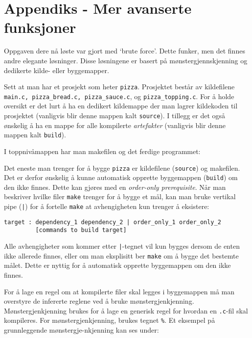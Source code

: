\appendix

\section{Appendiks - Mer avanserte funksjoner}\label{4-appendix}


Oppgaven dere nå løste var gjort med `brute force'. Dette funker, men det finnes andre elegante løsninger. Disse løsningene er basert på mønstergjennskjenning og dedikerte kilde- eller byggemapper.

Sett at man har et prosjekt som heter \verb|pizza|. Prosjektet består av kildefilene \verb|main.c, pizza_bread.c, pizza_sauce.c|, og \verb|pizza_topping.c|. For å holde oversikt er det lurt å ha en dedikert kildemappe der man lagrer kildekoden til prosjektet (vanligvis blir denne mappen kalt \verb|source|). I tillegg er det også ønskelig å ha en mappe for alle kompilerte \textit{artefakter} (vanligvis blir denne mappen kalt \verb|build|). 

I toppnivåmappen har man makefilen og det ferdige programmet:


Det eneste man trenger for å bygge \verb|pizza| er kildefilene (\verb|source|) og makefilen. Det er derfor ønskelig å kunne automatisk opprette byggemappen (\verb|build|) om den ikke finnes. Dette kan gjøres med en \textit{order-only prerequisite}. Når man beskriver hvilke filer \verb|make| trenger for å bygge et mål, kan man bruke vertikal pipe (\texttt{|}) for å fortelle \verb|make| at avhengigheten kun trenger å eksistere:

\begin{lstlisting}
target : dependency_1 dependency_2 | order_only_1 order_only_2
         [commands to build target]
\end{lstlisting}

Alle avhengigheter som kommer etter \texttt{|}-tegnet vil kun bygges dersom de enten ikke allerede finnes, eller om man eksplisitt ber \verb|make| om å bygge det bestemte målet. Dette er nyttig for å automatisk opprette byggemappen om den ikke finnes. 

For å lage en regel om at kompilerte filer skal legges i byggemappen må man overstyre de infererte reglene ved å bruke mønstergjenkjenning. Mønstergjenkjenning brukes for å lage en generisk regel for hvordan en \verb|.c|-fil skal kompileres. For mønstergjenkjenning, brukes tegnet \verb|%|. Et eksempel på grunnleggende  mønstergje-\newline nkjenning kan ses under:

